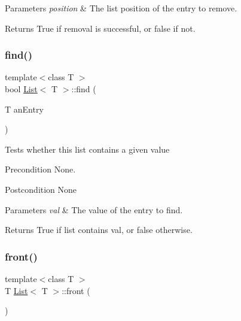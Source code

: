 \begin{DoxyParams}{Parameters}
{\em position} & The list position of the entry to remove. \\
\hline
\end{DoxyParams}
\begin{DoxyReturn}{Returns}
True if removal is successful, or false if not. 
\end{DoxyReturn}
\mbox{\label{class_list_a2be90274aca8ed14ede6d6892b4e82f1}} 
\subsubsection{\texorpdfstring{find()}{find()}}
{\footnotesize\ttfamily template$<$class T $>$ \\
bool \hyperlink{class_list}{List}$<$ T $>$\+::find (\begin{DoxyParamCaption}\item[{T}]{an\+Entry }\end{DoxyParamCaption})}

Tests whether this list contains a given value \begin{DoxyPrecond}{Precondition}
None. 
\end{DoxyPrecond}
\begin{DoxyPostcond}{Postcondition}
None 
\end{DoxyPostcond}

\begin{DoxyParams}{Parameters}
{\em val} & The value of the entry to find. \\
\hline
\end{DoxyParams}
\begin{DoxyReturn}{Returns}
True if list contains val, or false otherwise. 
\end{DoxyReturn}
\mbox{\label{class_list_a2606aeb0b00885fd7b3037a29ae28c8b}} 
\subsubsection{\texorpdfstring{front()}{front()}}
{\footnotesize\ttfamily template$<$class T $>$ \\
T \hyperlink{class_list}{List}$<$ T $>$\+::front (\begin{DoxyParamCaption}{ }\end{DoxyParamCaption})}

